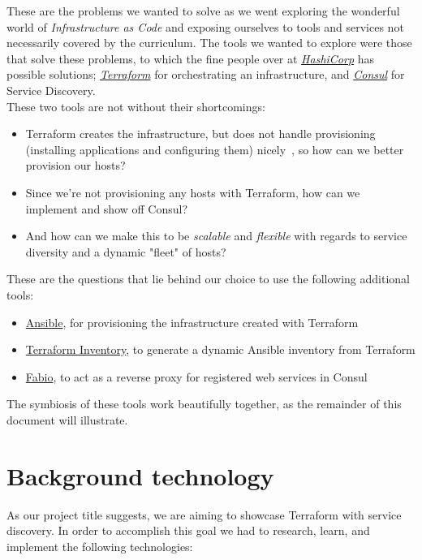         These are the problems we wanted to solve as we went exploring the wonderful world of \textit{Infrastructure as Code} and exposing ourselves to tools and services not necessarily covered by the curriculum. The tools we wanted to explore were those that solve these problems, to which the fine people over at \href{https://www.hashicorp.com/}{\textit{HashiCorp}} has possible solutions; \href{https://www.hashicorp.com/products/terraform}{\textit{Terraform}} for orchestrating an infrastructure, and \href{https://www.hashicorp.com/products/consul}{\textit{Consul}} for Service Discovery.\\
        
        These two tools are not without their shortcomings: 
        \begin{itemize}
            \item Terraform creates the infrastructure, but does not handle provisioning (installing applications and configuring them) nicely~\cite{Terraform:Provisioning}, so how can we better provision our hosts?
            \item Since we're not provisioning any hosts with Terraform, how can we implement and show off Consul?
            \item And how can we make this to be \textit{scalable} and \textit{flexible} with regards to service diversity and a dynamic "fleet" of hosts?
        \end{itemize}

        These are the questions that lie behind our choice to use the following additional tools:
        
        \begin{itemize}
            \item \href{https://www.ansible.com/}{Ansible}, for provisioning the infrastructure created with Terraform
            \item \href{https://github.com/adammck/terraform-inventory#readme}{Terraform Inventory}, to generate a dynamic Ansible inventory from Terraform
            \item \href{https://fabiolb.net/}{Fabio}, to act as a reverse proxy for registered web services in Consul
        \end{itemize}
        
        The symbiosis of these tools work beautifully together, as the remainder of this document will illustrate.

    \section{Background technology}
        As our project title suggests, we are aiming to showcase Terraform with service discovery. In order to accomplish this goal we had to research, learn, and implement the following technologies:

